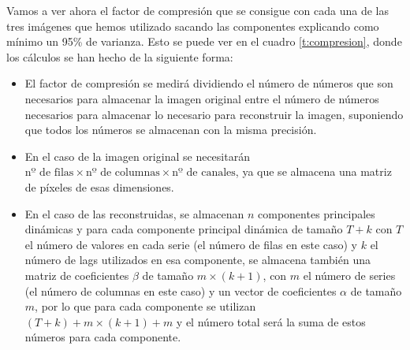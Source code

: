 Vamos a ver ahora el factor de compresión que se consigue con cada una de las tres imágenes que hemos utilizado sacando las componentes explicando como mínimo un 95\% de varianza. Esto se puede ver en el cuadro \ref{t:compresion}, donde los cálculos se han hecho de la siguiente forma:
\begin{itemize}
\item El factor de compresión se medirá dividiendo el número de números que son necesarios para almacenar la imagen original entre el número de números necesarios para almacenar lo necesario para reconstruir la imagen, suponiendo que todos los números se almacenan con la misma precisión.
\item En el caso de la imagen original se necesitarán $\text{nº de filas}\times \text{nº de columnas} \times \text{nº de canales}$, ya que se almacena una matriz de píxeles de esas dimensiones.
\item En el caso de las reconstruidas, se almacenan $n$ componentes principales dinámicas y para cada componente principal dinámica de tamaño $T+k$ con $T$ el número de valores en cada serie (el número de filas en este caso) y $k$ el número de lags utilizados en esa componente, se almacena también una matriz de coeficientes $\beta$ de tamaño $m\times (k+1)$, con $m$ el número de series (el número de columnas en este caso) y un vector de coeficientes $\alpha$ de tamaño $m$, por lo que para cada componente se utilizan $(T+k)+m \times (k+1) + m$ y el número total será la suma de estos números para cada componente.
\end{itemize}

